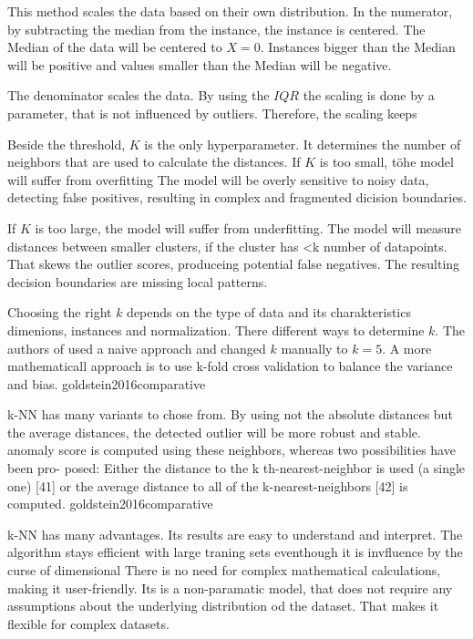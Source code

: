 This method scales the data based on their own distribution.
In the numerator, by subtracting the median from the instance, the instance is centered.
The Median of the data will be centered to $X=0$.
Instances bigger than the Median will be positive and values smaller than the Median will be negative.


The denominator scales the data.
By using the $IQR$ the scaling is done by a parameter, that is not influenced by outliers.
Therefore, the scaling keeps 


Beside the threshold, $K$ is the only hyperparameter.
It determines the number of neighbors that are used to calculate the distances.  
If $K$ is too small, töhe model will suffer from overfitting
The model will be overly sensitive to noisy data, detecting false positives, resulting in complex and fragmented dicision boundaries.


If $K$ is too large, the model will suffer from underfitting.
The model will measure distances between smaller clusters, if the cluster has <k number of datapoints. 
That skews the outlier scores, produceing potential false negatives. 
The resulting decision boundaries are missing local patterns.


Choosing the right $k$ depends on the type of data and its charakteristics dimenions, instances and normalization.
There different ways to determine $k$. 
The authors of \citet{shenkar2022anomaly} used a naive approach and changed $k$ manually to $k=5$.
A more mathematicall approach is to use k-fold cross validation to balance the variance and bias.
goldstein2016comparative

k-NN has many variants to chose from. 
By using not the absolute distances but the average distances, the detected outlier will be more robust and stable. \citep{angiulli2002fast}
anomaly score is computed using these neighbors, whereas two possibilities have been pro-
posed: Either the distance to the k th-nearest-neighbor is used (a single one) [41] or the average
distance to all of the k-nearest-neighbors [42] is computed. goldstein2016comparative

k-NN has many advantages. Its results are easy to understand and interpret.
The algorithm stays efficient with large traning sets eventhough it is invfluence by the curse of dimensional
There is no need for complex mathematical calculations, making it user-friendly.
Its is a non-paramatic model, that does not require any assumptions about the underlying distribution od the dataset.
That makes it flexible for complex datasets.


